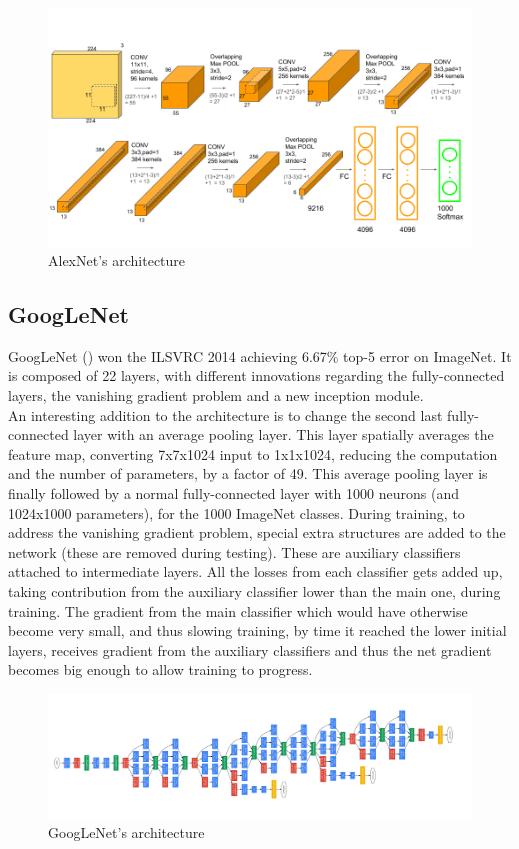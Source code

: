 \documentclass{article}
\begin{document}
\begin{figure}[h]
	\centering
	\includegraphics[width=0.7\linewidth]{image/AlexNet}
	\caption{AlexNet's architecture}
	\label{fig:alexnet}
\end{figure}
\newpage
\subsection{GoogLeNet}
GoogLeNet (\cite{googlenet}) won the ILSVRC 2014 achieving 6.67\% top-5 error on ImageNet. It is composed of 22 layers, with different innovations regarding the fully-connected layers, the vanishing gradient problem and a new inception module.\\
An interesting addition to the architecture is to change the second last fully-connected layer with an average pooling layer. This layer spatially averages the feature map, converting 7x7x1024 input to 1x1x1024, reducing the computation and the number of parameters, by a factor of 49. This average pooling layer is finally followed by a normal fully-connected layer with 1000 neurons (and 1024x1000 parameters), for the 1000 ImageNet classes.
During training, to address the vanishing gradient problem, special extra structures are added to the network (these are removed during testing). These are auxiliary classifiers attached to intermediate layers. All the losses from each classifier gets added up, taking contribution from the auxiliary classifier lower
than the main one, during training. The gradient from the main classifier which would have otherwise become very small, and thus slowing training, by time it reached the lower initial layers, receives gradient from the auxiliary classifiers and thus the net gradient becomes big enough to allow training to progress.
\begin{figure}[h]
	\centering
	\includegraphics[width=0.7\linewidth]{image/GoogLeNet}
	\caption[]{GoogLeNet's architecture}
	\label{fig:googlenet}
\end{figure}
\end{document}
